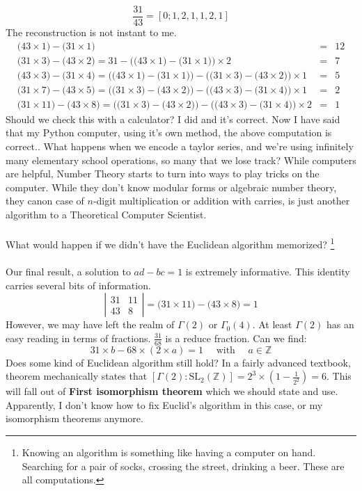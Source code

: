 \documentclass[12pt]{article}
\begin{document}
$$ \frac{31}{43} = [0;1,2,1,1,2,1] $$
The reconstruction is not instant to me.
\begin{eqnarray*} \big( 43 \times 1 \big)- \big(31 \times 1 \big) &=& 12 \\
\big(31 \times 3 \big) - \big( 43 \times 2 \big)= 31 - \Big( \big( 43 \times 1 \big)- \big(31 \times 1 \big) \Big) \times 2 &=& 7 \\ 
\big( 43 \times 3  \big)- \big( 31 \times 4\big) = \Big(\big( 43 \times 1 \big)- \big(31 \times 1 \big)\Big) - \Big(\big(31 \times 3 \big) - \big( 43 \times 2 \big) \Big) \times 1 &=& 5 \\ 
\big( 31 \times 7 \big) - \big(43 \times 5 \big)  = \Big( \big(31 \times 3 \big) - \big( 43 \times 2 \big) \Big) - \Big( \big( 43 \times 3  \big)- \big( 31 \times 4\big) \Big) \times 1&=& 2  \\ 
\big( 31 \times 11 \big) - \big(43 \times 8 \big)  = \Big( \big(31 \times 3 \big) - \big( 43 \times 2 \big) \Big) - \Big( \big( 43 \times 3  \big)- \big( 31 \times 4\big) \Big) \times 2 &=& 1\end{eqnarray*}
Should we check this with a calculator?  I did and it's correct.  Now I have said that my Python computer, using it's own method, the above computation is correct..  What happens when we encode a taylor series, and we're using infinitely many elementary school operations, so many that we lose track? While computers are helpful, Number Theory starts to turn into ways to play tricks on the computer.  While they don't know modular forms or algebraic number theory, they canon case of $n$-digit multiplication or addition with carries, is just another algorithm to a Theoretical Computer Scientist. \\ \\
What would happen if we didn't have the Euclidean algorithm memorized? \footnote{Knowing an algorithm is something like having a computer on hand.  Searching for a pair of socks, crossing the street, drinking a beer.  These are all computations.} \\ \\
Our final result, a solution to $ad-bc = 1$ is extremely informative.  This identity carries several bits of information.
$$ \left| \begin{array}{rr} 31 & 11 \\ 43 & 8 \end{array} \right|  = \big( 31 \times 11 \big) - \big(43 \times 8 \big)  = 1 $$
However, we may have left the realm of $\Gamma(2)$ or $\Gamma_0(4)$.  At least $\Gamma(2)$ has an easy reading in terms of fractions. $\frac{31}{68}$ is a reduce fraction.  Can we find:
$$ 31 \times b   - 68 \times (2 \times a) = 1 \quad\text{ with }\quad a \in \mathbb{Z} $$
Does some kind of Euclidean algorithm still hold?  In a fairly advanced textbook, theorem mechanically states that $[\Gamma(2): \text{SL}_2(\mathbb{Z})]=2^3 \times (1 - \frac{1}{2^2}) = 6$.  This will fall out of \textbf{First isomorphism theorem} which we should state and use.  Apparently, I don't know how to fix Euclid's algorithm in this case, or my isomorphism theorems anymore.
\end{document}
